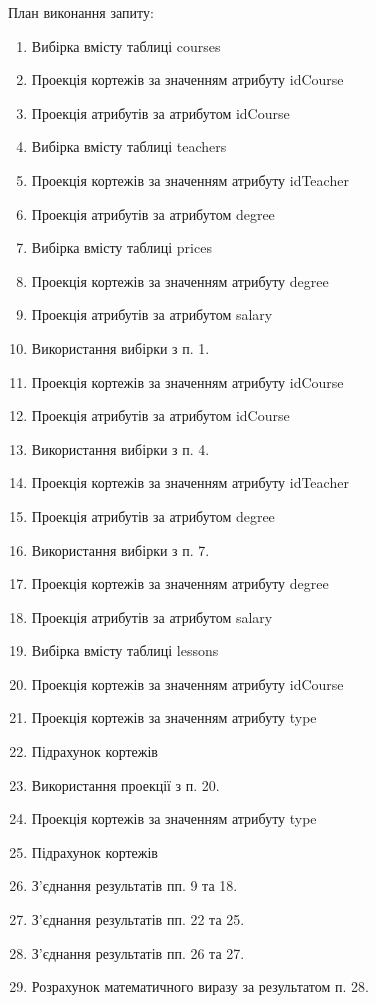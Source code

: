 \FloatBarrier
План виконання запиту:
\begin{enumerate}
\item Вибірка вмісту таблиці courses
\item Проекція кортежів за значенням атрибуту idCourse
\item Проекція атрибутів за атрибутом idCourse
\item Вибірка вмісту таблиці teachers
\item Проекція кортежів за значенням атрибуту idTeacher
\item Проекція атрибутів за атрибутом degree
\item Вибірка вмісту таблиці prices
\item Проекція кортежів за значенням атрибуту degree
\item Проекція атрибутів за атрибутом salary
\item Використання вибірки з п. 1.
\item Проекція кортежів за значенням атрибуту idCourse
\item Проекція атрибутів за атрибутом idCourse
\item Використання вибірки з п. 4.
\item Проекція кортежів за значенням атрибуту idTeacher
\item Проекція атрибутів за атрибутом degree
\item Використання вибірки з п. 7.
\item Проекція кортежів за значенням атрибуту degree
\item Проекція атрибутів за атрибутом salary
\item Вибірка вмісту таблиці lessons
\item Проекція кортежів за значенням атрибуту idCourse
\item Проекція кортежів за значенням атрибуту type
\item Підрахунок кортежів
\item Використання проекції з п. 20.
\item Проекція кортежів за значенням атрибуту type
\item Підрахунок кортежів
\item З'єднання результатів пп. 9 та 18.
\item З'єднання результатів пп. 22 та 25.
\item З'єднання результатів пп. 26 та 27.
\item Розрахунок математичного виразу за результатом п. 28.
\end{enumerate}

